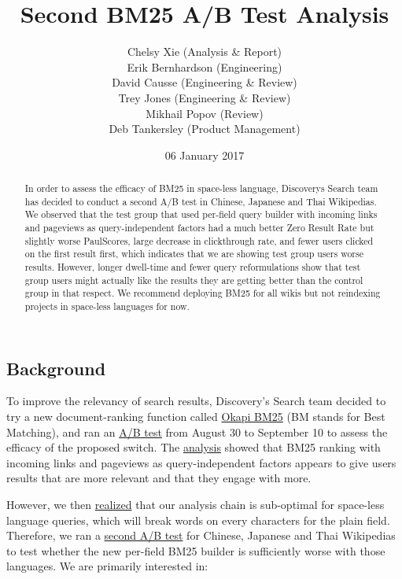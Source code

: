 \documentclass[12pt,]{article}
\title{Second BM25 A/B Test Analysis}
\author{Chelsy Xie (Analysis \& Report) \\ Erik Bernhardson (Engineering) \\ David Causse (Engineering \& Review) \\ Trey Jones (Engineering \& Review) \\ Mikhail Popov (Review) \\ Deb Tankersley (Product Management)}
\date{06 January 2017}
\begin{document}
\maketitle

\renewcommand{\abstractname}{Executive Summary}

\begin{abstract}
In order to assess the efficacy of BM25 in space-less language, Discovery\textquotesingle s Search team has decided to conduct a second A/B test in Chinese, Japanese and Thai Wikipedias. We observed that the test group that used per-field query builder with incoming links and pageviews as query-independent factors had a much better Zero Result Rate but slightly worse PaulScores, large decrease in clickthrough rate, and fewer users clicked on the first result first, which indicates that we are showing test group users worse results. However, longer dwell-time and fewer query reformulations show that test group users might actually like the results they are getting better than the control group in that respect. We recommend deploying BM25 for all wikis but not reindexing projects in space-less languages for now.
\end{abstract}

\subsection{Background}\label{background}

To improve the relevancy of search results, Discovery's Search team
decided to try a new document-ranking function called
\href{https://en.wikipedia.org/wiki/Okapi_BM25}{Okapi BM25} (BM stands
for Best Matching), and ran an
\href{https://phabricator.wikimedia.org/T143585}{A/B test} from August
30 to September 10 to assess the efficacy of the proposed switch. The
\href{https://wikimedia-research.github.io/Discovery-Search-Test-BM25}{analysis}
showed that BM25 ranking with incoming links and pageviews as
query-independent factors appears to give users results that are more
relevant and that they engage with more.

However, we then
\href{https://phabricator.wikimedia.org/T147008\#2679631}{realized} that
our analysis chain is sub-optimal for space-less language queries, which
will break words on every characters for the plain field. Therefore, we
ran a \href{https://phabricator.wikimedia.org/T147495}{second A/B test}
for Chinese, Japanese and Thai Wikipedias to test whether the new
per-field BM25 builder is sufficiently worse with those languages. We
are primarily interested in:
\end{document}
